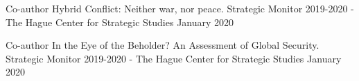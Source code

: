 

\begin{cventries}

  \cventry
    {Co-author} %
    {Hybrid Conflict: Neither war, nor peace.} %
    {Strategic Monitor 2019-2020 - The Hague Center for Strategic Studies} %
    {January 2020} %

  \cventry
    {Co-author} %
    {In the Eye of the Beholder? An Assessment of Global Security.} %
    {Strategic Monitor 2019-2020 - The Hague Center for Strategic Studies} %
    {January 2020} %

\end{cventries}
